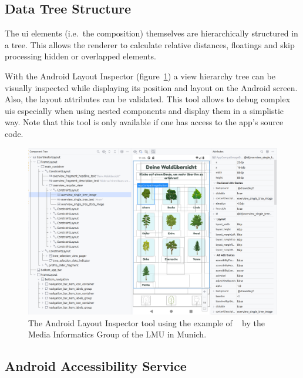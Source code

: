 \subsection{Data Tree Structure}
\label{subsec:data-tree-structure}

The \gls{ui} elements (i.e.\ the composition) themselves are hierarchically structured in a tree.
This allows the renderer to calculate relative distances, floatings and skip processing hidden or overlapped elements.

With the Android Layout Inspector (figure~\ref{fig:android_layout_inspector}) a view hierarchy tree can be visually inspected while displaying its position and layout on the Android screen.
Also, the layout attributes can be validated.
This tool allows to debug complex \gls{ui}s especially when using nested components and display them in a simplistic way.
Note that this tool is only available if one has access to the app's source code.

\begin{figure}[htbp!]
    \centering
    \includegraphics[width=\textwidth]{graphics/android_layout_inspector}
    \caption[Android Layout Inspector tool]{The Android Layout Inspector tool using the example of ~\cite{mimuc_app_ins_gruene} by the Media Informatics Group of the LMU in Munich.}
    \label{fig:android_layout_inspector}
\end{figure}

\subsection{Android Accessibility Service}
\label{subsec:android-accessibility-service}


